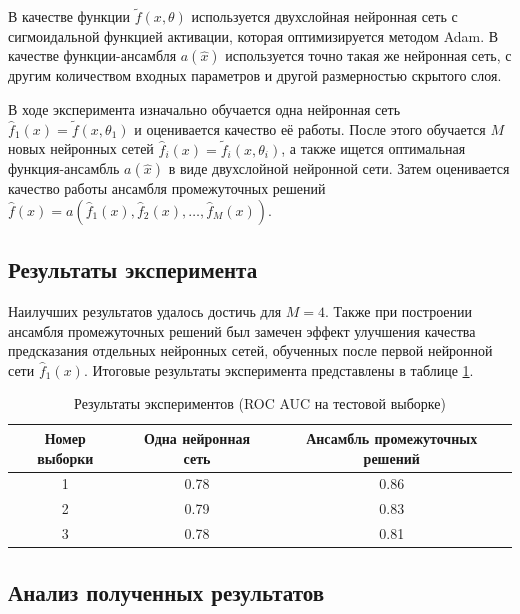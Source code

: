 \documentclass[12pt, fleqn]{article}
\newcommand{\predictionfunction}{\hat{f}}
\newcommand{\ensemblefunction}{a}
\newcommand{\optimizationmethodfunction}{\tilde{f}}
\newcommand{\numberpredictionfunctions}{M}
\newcommand{\many}[3]{#1 1 #2, #1 2 #2, \dots, #1 #3 #2}  %
\newcommand{\ensemblefunctionfull}{\ensemblefunction(\many{\predictionfunction_}{(x)}{\numberpredictionfunctions})}
\begin{document}
В качестве функции $\optimizationmethodfunction(x, \theta)$ используется двухслойная нейронная сеть с сигмоидальной функцией активации, которая оптимизируется методом Adam. В качестве функции-ансамбля $\ensemblefunction(\hat{x})$ используется точно такая же нейронная сеть, с другим количеством входных параметров и другой размерностью скрытого слоя.

В ходе эксперимента изначально обучается одна нейронная сеть $\predictionfunction_1(x) = \optimizationmethodfunction(x, \theta_1)$ и оценивается качество её работы. После этого обучается $\numberpredictionfunctions$ новых нейронных сетей $\predictionfunction_i(x) = \optimizationmethodfunction_i(x, \theta_i)$, а также ищется оптимальная функция-ансамбль $\ensemblefunction(\hat{x})$ в виде двухслойной нейронной сети. Затем оценивается качество работы ансамбля промежуточных решений $\predictionfunction(x) = \ensemblefunctionfull$.

\subsection{Результаты эксперимента}

Наилучших результатов удалось достичь для $\numberpredictionfunctions = 4$. Также при построении ансамбля промежуточных решений был замечен эффект улучшения качества предсказания отдельных нейронных сетей, обученных после первой нейронной сети $\predictionfunction_1(x)$.
Итоговые результаты эксперимента представлены в таблице \ref{tabular:results}.

\begin{table}[h!]
	\begin{center}
		\begin{tabular}{|c|c|c|}
			\hline
			Номер выборки & Одна нейронная сеть & Ансамбль промежуточных решений \\
			\hline
			1 & 0.78 & 0.86 \\
			\hline
			2 & 0.79 & 0.83 \\
			\hline
			3 & 0.78 & 0.81 \\
			\hline
		\end{tabular}
	\end{center}
	
	\caption{Результаты экспериментов (ROC AUC на тестовой выборке)}
	\label{tabular:results}
\end{table}

\subsection{Анализ полученных результатов}
\end{document}
